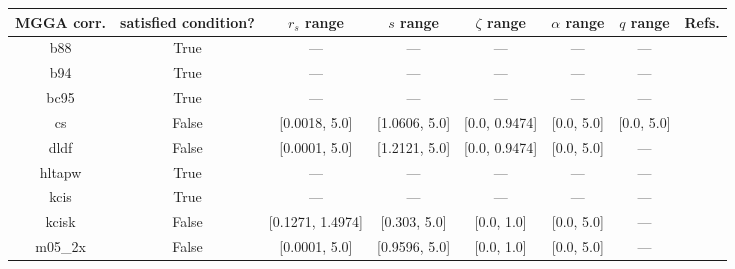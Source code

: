 \begin{tabular}{|c|c|c|c|c|c|c|l|}
\hline
   MGGA corr. &  satisfied condition? &      $r_s$ range &        $s$ range &    $\zeta$ range & $\alpha$ range & $q$ range  &                                                                              Refs. \\ \hline
          b88 &                  True &              --- &              --- &              --- &            --- &        --- &                                                              \cite{Becke1988_1053} \\ \hline
          b94 &                  True &              --- &              --- &              --- &            --- &        --- &                                                               \cite{Becke1994_625} \\ \hline
         bc95 &                  True &              --- &              --- &              --- &            --- &        --- &                                                              \cite{Becke1996_1040} \\ \hline
           cs &                 False &    [0.0018, 5.0] &    [1.0606, 5.0] &    [0.0, 0.9474] &     [0.0, 5.0] & [0.0, 5.0] &                                                   \cite{Colle1975_329,Lee1988_785} \\ \hline
         dldf &                 False &    [0.0001, 5.0] &    [1.2121, 5.0] &    [0.0, 0.9474] &     [0.0, 5.0] &        --- &                                                           \cite{Pernal2009_263201} \\ \hline
       hltapw &                  True &              --- &              --- &              --- &            --- &        --- &                                                             \cite{Lehtola2021_943} \\ \hline
         kcis &                  True &              --- &              --- &              --- &            --- &        --- & \cite{Rey1998_581,Krieger1999_463,Krieger2001_48,Kurth1999_889,Toulouse2002_10465} \\ \hline
        kcisk &                 False & [0.1271, 1.4974] &     [0.303, 5.0] &       [0.0, 1.0] &     [0.0, 5.0] &        --- & \cite{Rey1998_581,Krieger1999_463,Krieger2001_48,Kurth1999_889,Toulouse2002_10465} \\ \hline
      m05\_2x &                 False &    [0.0001, 5.0] &    [0.9596, 5.0] &       [0.0, 1.0] &     [0.0, 5.0] &        --- &                                                                \cite{Zhao2006_364} \\ \hline

\end{tabular}
